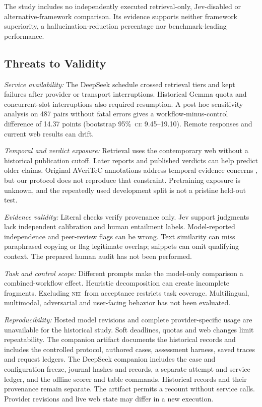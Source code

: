 \documentclass[conference]{IEEEtran}
\newcommand{\NEI}{\textsc{nei}}
\newcommand{\CI}{\textsc{ci}}
\newcommand{\pct}{\%}
\begin{document}
The study includes no independently executed retrieval-only, Jev-disabled or alternative-framework comparison. Its evidence supports neither framework superiority, a hallucination-reduction percentage nor benchmark-leading performance.

\subsection{Threats to Validity}
\textit{Service availability:} The DeepSeek schedule crossed retrieval tiers and kept failures after provider or transport interruptions. Historical Gemma quota and concurrent-slot interruptions also required resumption. A post hoc sensitivity analysis on 487 pairs without fatal errors gives a workflow-minus-control difference of 14.37 points (bootstrap 95\pct\ \CI: 9.45--19.10). Remote responses and current web results can drift.

\textit{Temporal and verdict exposure:} Retrieval uses the contemporary web without a historical publication cutoff. Later reports and published verdicts can help predict older claims. Original AVeriTeC annotations address temporal evidence concerns \cite{averitec}, but our protocol does not reproduce that constraint. Pretraining exposure is unknown, and the repeatedly used development split is not a pristine held-out test.

\textit{Evidence validity:} Literal checks verify provenance only. Jev support judgments lack independent calibration and human entailment labels. Model-reported independence and peer-review flags can be wrong. Text similarity can miss paraphrased copying or flag legitimate overlap; snippets can omit qualifying context. The prepared human audit has not been performed.

\textit{Task and control scope:} Different prompts make the model-only comparison a combined-workflow effect. Heuristic decomposition can create incomplete fragments. Excluding \NEI\ from acceptance restricts task coverage. Multilingual, multimodal, adversarial and user-facing behavior has not been evaluated.

\textit{Reproducibility:} Hosted model revisions and complete provider-specific usage are unavailable for the historical study. Soft deadlines, quotas and web changes limit repeatability. The companion artifact documents the historical records and includes the controlled protocol, authored cases, assessment harness, saved traces and request ledgers. The DeepSeek companion includes the case and configuration freeze, journal hashes and records, a separate attempt and service ledger, and the offline scorer and table commands. Historical records and their provenance remain separate. The artifact permits a recount without service calls. Provider revisions and live web state may differ in a new execution.
\end{document}
